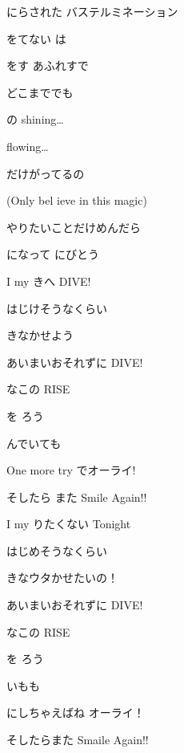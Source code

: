 \documentclass[14pt]{extreport}
\begin{document}
{\item
  にらされた バステルミネーション
  \jisho{}

  をてない は
  \jisho{}

  をす あふれすで
  \jisho{}

  どこまででも
  \jisho{}

\item
  の shining…
  \jisho{}

   flowing…
  \jisho{}

  だけがってるの
  \jisho{}

  (Only bel ieve in this magic)
  \jisho{}

  やりたいことだけめんだら
  \jisho{}

  になって にびとう
  \jisho{}

\item
  I my  きへ DIVE!
  \jisho{}

  はじけそうなくらい
  \jisho{}

  きなかせよう
  \jisho{}

  あいまいおそれずに DIVE!
  \jisho{}

  なこの RISE
  \jisho{}

  を ろう
  \jisho{}

  んでいても
  \jisho{}

  One more try でオーライ!
  \jisho{}

  そしたら また Smile Again!!
  \jisho{}

\item
  I my  りたくない Tonight
  \jisho{}

  はじめそうなくらい
  \jisho{}

  きなウタかせたいの！
  \jisho{}

  あいまいおそれずに DIVE!
  \jisho{}

  なこの RISE
  \jisho{}

  を ろう
  \jisho{}

  いもも
  \jisho{}

  にしちゃえばね オーライ！
  \jisho{}

  そしたらまた Smaile Again!!
  \jisho{}


}
\end{document}
